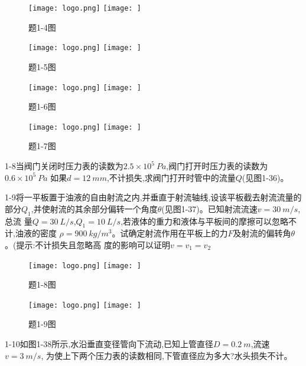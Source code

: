 \begin{figure}[h]
    \centering
    \ifOpenSource
    \texttt{[image: logo.png]}
    \else
    \texttt{[image: ]}
    \fi
    \caption{题1-4图}
    \label{fig:fig0132}
\end{figure}

\begin{figure}[h]
    \centering
    \ifOpenSource
    \texttt{[image: logo.png]}
    \else
    \texttt{[image: ]}
    \fi
    \caption{题1-5图}
    \label{fig:fig0133}
\end{figure}

\begin{figure}[h]
    \centering
    \ifOpenSource
    \texttt{[image: logo.png]}
    \else
    \texttt{[image: ]}
    \fi
    \caption{题1-6图}
    \label{fig:fig0134}
\end{figure}

\begin{figure}[h]
    \centering
    \ifOpenSource
    \texttt{[image: logo.png]}
    \else
    \texttt{[image: ]}
    \fi
    \caption{题1-7图}
    \label{fig:fig0135}
\end{figure}

1-8\quad 当阀门关闭时压力表的读数为$2.5\times 10^{5}\ Pa$,阀门打开时压力表的读数为$0.6\times 10^5\ Pa$
如果$d=12\ mm$,不计损失,求阀门打开时管中的流量$Q$(见图1-36)。

1-9\quad 将一平板置于油液的自由射流之内,并垂直于射流轴线,设该平板截去射流流量的
部分$Q_1$,并使射流的其余部分偏转一个角度$\theta $(见图1-37)。已知射流流速$v=30\ m/s$,总流
量$Q=30\ L/s$,$Q_1=10\ L/s$,若液体的重力和液体与平板间的摩擦可以忽略不计,油液的密度
$\rho=900\ kg/m^3$。试确定射流作用在平板上的力$F$及射流的偏转角$\theta $。(提示:不计损失且忽略高
度的影响可以证明$v=v_1=v_2$

\begin{figure}[h]
    \centering
    \ifOpenSource
    \texttt{[image: logo.png]}
    \else
    \texttt{[image: ]}
    \fi
    \caption{题1-8图}
    \label{fig:fig0136}
\end{figure}

\begin{figure}[h]
    \centering
    \ifOpenSource
    \texttt{[image: logo.png]}
    \else
    \texttt{[image: ]}
    \fi
    \caption{题1-9图}
    \label{fig:fig0137}
\end{figure}

1-10\quad 如图1-38所示,水沿垂直变径管向下流动,已知上管直径$D=0.2\ m$,流速$v=3\ m/s$,
为使上下两个压力表的读数相同,下管直径应为多大?水头损失不计。

